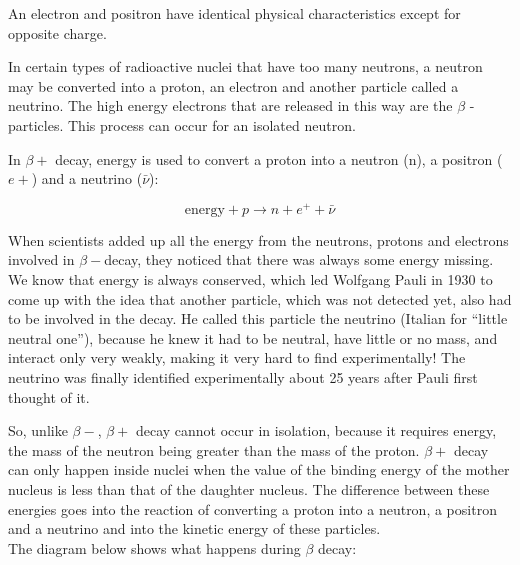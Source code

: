 An electron and positron have identical physical characteristics except for opposite charge.

In certain types of radioactive nuclei that have too many neutrons, a neutron may be converted into a proton, an electron and another particle called a neutrino. The high energy electrons that are released in this way are the $\beta$ - particles. This process can occur for an isolated neutron.

In $\beta +$ decay, energy is used to convert a proton into a neutron (n), a
positron ($e+$) and a neutrino ($\bar{\nu}$):

\begin{equation*}
\mbox{energy} + p \rightarrow n + e^+ + {\bar{\nu}}
\end{equation*}

\begin{IFact}{
When scientists added up all the energy from the neutrons, protons and electrons involved in $\beta -$decay, they noticed that there was always some energy missing. We know that energy is always conserved, which led Wolfgang Pauli in 1930 to come up with the idea that another particle, which was not detected yet, also had to be involved in the decay. He called this particle the neutrino (Italian for ``little neutral one''), because he knew it had to be neutral, have little or no mass, and interact only very weakly, making it very hard to find experimentally! The neutrino was finally identified experimentally about 25 years after Pauli first thought of it.}
\end{IFact}

So, unlike $\beta -$, $\beta +$ decay cannot occur in isolation, because it requires energy, the mass of the neutron being greater than the mass of the
proton. $\beta +$ decay can only happen inside nuclei when the value of the binding energy of the mother nucleus is less than that of the daughter
nucleus. The difference between these energies goes into the reaction of
converting a proton into a neutron, a positron and a neutrino and into
the kinetic energy of these particles.\\


The diagram below shows what happens during $\beta$ decay:

